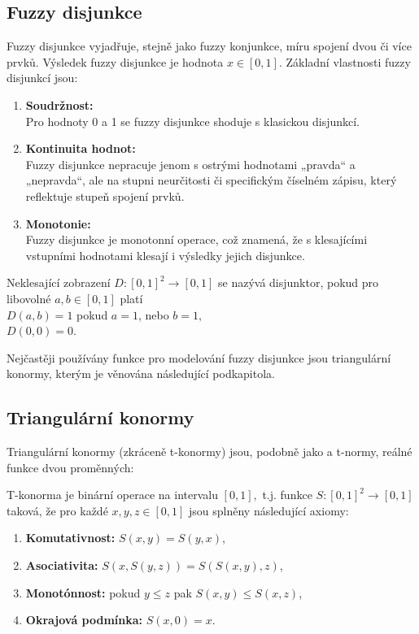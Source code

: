 \subsection{Fuzzy disjunkce} 
Fuzzy disjunkce vyjadřuje, stejně jako fuzzy konjunkce, míru spojení dvou či více prvk\r u. Výsledek fuzzy disjunkce je hodnota $x \in [0,1].$ 
Základní vlastnosti fuzzy disjunkcí jsou:
\begin{enumerate}
    \item \textbf{Soudržnost:}\\
    Pro hodnoty 0 a 1 se fuzzy disjunkce shoduje s klasickou disjunkcí.
    \item \textbf{Kontinuita hodnot:}\\
    Fuzzy disjunkce nepracuje jenom s  ostrými hodnotami „pravda“ a „nepravda“, ale na stupni neurčitosti či specifickým číselném zápisu, který reflektuje stupeň spojení prvk\r u.
   \item \textbf{Monotonie:}\\
    Fuzzy disjunkce je monotonní operace, což znamená, že s klesajícími vstupními hodnotami klesají i výsledky jejich disjunkce.
\end{enumerate}

\begin{definition}
    \cite{Kolo}
    Neklesající zobrazení $D: [0,1]^2 \rightarrow [0,1]$ se nazývá disjunktor, pokud pro libovolné $a, b \in [0,1]$ platí\\ $D(a,b) = 1$ pokud  $a = 1$, nebo  $b = 1,$\\
    $D(0,0) = 0.$
\end{definition}

Nej\v cast\v eji pou\v z\'iv\'any funkce pro modelov\'an\'i fuzzy disjunkce jsou triangul\'arn\'i konormy, kter\'ym je v\v enov\'ana n\'asleduj\'ic\'i podkapitola.

\subsection{Triangul\'arn\'i konormy} 
\label{sec: Triangulární konormy}

Triangulární konormy (zkráceně t-konormy) jsou, podobn\v e jako a t-normy, re\'aln\'e funkce dvou prom\v enn\'ych:
\begin{definition}
    T-konorma je binární operace na intervalu $[0,1],$ t.j. funkce $S: [0,1]^2 \rightarrow [0,1]$ taková, že pro každé $x, y, z \in [0,1]$ jsou splněny následující axiomy:
    \begin{enumerate}
        \item \textbf{Komutativnost: } $S(x,y) = S(y,x),$
        \item \textbf{Asociativita: } $S(x,S(y,z)) = S(S(x,y),z)$,
        \item \textbf{Monotónnost:} pokud $y \leq z$ pak $S(x, y) \leq S(x, z)$,
        \item \textbf{Okrajová podmínka: } $S(x,0) = x.$
    \end{enumerate}
\end{definition}

